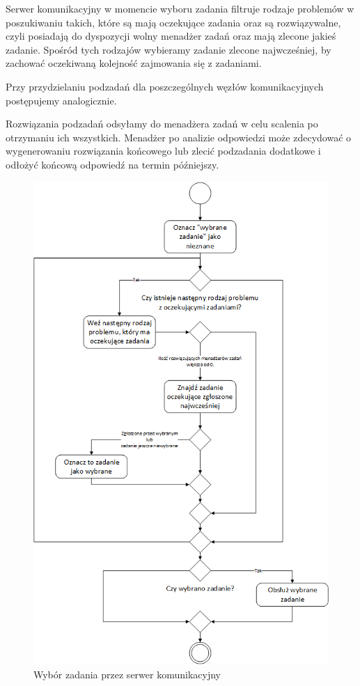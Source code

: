 \documentclass[12pt,a4paper,titlepage]{report}
\begin{document}
	Serwer komunikacyjny w momencie wyboru zadania filtruje rodzaje problemów w poszukiwaniu takich,
	które są mają oczekujące zadania oraz są rozwiązywalne, czyli posiadają do dyspozycji wolny menadżer zadań 
	oraz mają zlecone jakieś zadanie. Spośród tych rodzajów wybieramy zadanie zlecone najwcześniej, by zachować
	oczekiwaną kolejność zajmowania się z zadaniami.
	
	Przy przydzielaniu podzadań dla poszczególnych węzłów komunikacyjnych postępujemy analogicznie.
	
	Rozwiązania podzadań odsyłamy do menadżera zadań w celu scalenia po otrzymaniu ich wszystkich. Menadżer
	po analizie odpowiedzi może zdecydować o wygenerowaniu rozwiązania końcowego lub zlecić podzadania dodatkowe
	i odłożyć końcową odpowiedź na termin późniejszy. 
	
	\begin{figure}[h]
		\centering
		\caption{Wybór zadania przez serwer komunikacyjny}
		\includegraphics[width=\textwidth]{img/CommunicationServer-SelectTask.png}
	\end{figure}
	
\end{document}

